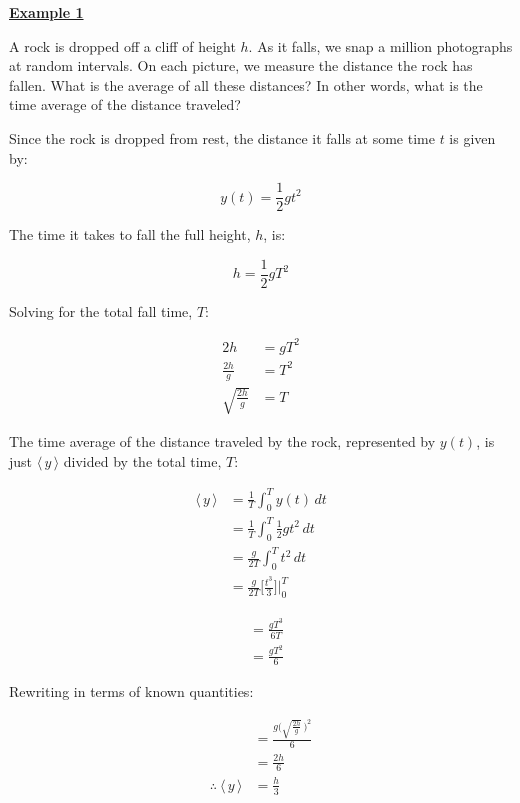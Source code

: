 \clearpage

\textbf{\underline{Example 1}}

A rock is dropped off a cliff of height $h$. As it falls, we snap a million photographs at random intervals.
On each picture, we measure the distance the rock has fallen. What is the average of all these distances? In other
words, what is the time average of the distance traveled?

Since the rock is dropped from rest, the distance it falls at some time $t$ is given by:

\[
  y(t) = \frac{1}{2}gt^{2}
\]

The time it takes to fall the full height, $h$, is:

\[
  h = \frac{1}{2}gT^{2}
\]

Solving for the total fall time, $T$:

\begin{align*}
  2h &= gT^{2} \\[1.5ex]
  \frac{2h}{g} &= T^{2} \\[1.5ex]
  \sqrt{\frac{2h}{g}} &= T
\end{align*}

The time average of the distance traveled by the rock, represented by $y(t)$, is just
$\langle \, y \, \rangle$ divided by the total time, $T$:

\begin{align*}
  \langle \, y \, \rangle &= \frac{1}{T} \int_{0}^{T} y(t) \, dt \\[1.5ex]
  &= \frac{1}{T} \int_{0}^{T} \frac{1}{2}gt^{2} \, dt \\[1.5ex]
  &= \frac{g}{2T} \int_{0}^{T} t^{2} \, dt \\[1.5ex]
  &= \frac{g}{2T} \Bigg[ \frac{t^{3}}{3} \Bigg] \Bigg|_{0}^{T}
\end{align*}

\newpage

\begin{align*}
  &= \frac{gT^{3}}{6T} \\[1.5ex]
  &= \frac{gT^{2}}{6}
\end{align*}

Rewriting in terms of known quantities:

\begin{align*}
  &= \frac{g \Big(\sqrt{\frac{2h}{g}} \, \Big)^{2}}{6} \\[1.5ex]
  &= \frac{2h}{6} \\[1.5ex]
  \therefore \: \langle \, y \, \rangle &= \boxed{\frac{h}{3}}
\end{align*}

